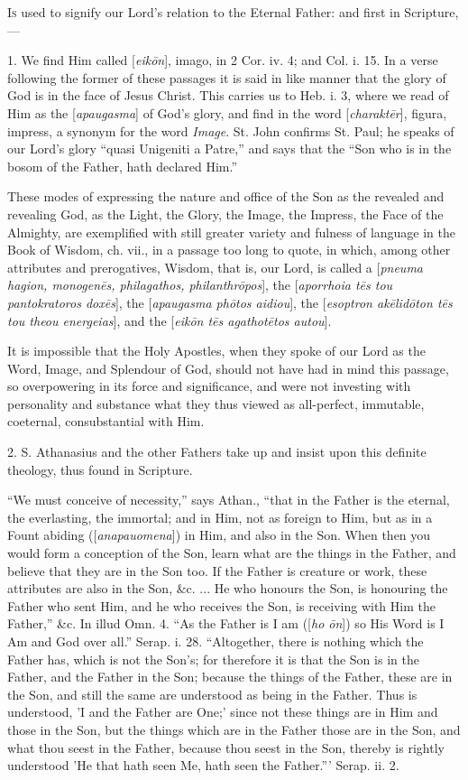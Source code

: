 
I\textsc{s} used to signify our Lord's relation to the
Eternal Father: and first in Scripture,—

1. We find Him called [\emph{eik\={o}n}],
imago, in 2 Cor. iv. 4; and Col. i. 15. In a verse following the
former of these passages it is said in like manner that the glory of
God is in the face of Jesus Christ. This carries us to Heb. i. 3,
where we read of Him as the [\emph{apaugasma}] of God's glory, and
find in the word [\emph{charakt\={e}r}], figura, impress, a synonym
for the word \emph{Image}. St. John confirms St. Paul; he speaks of
our Lord's glory ``quasi Unigeniti a Patre,'' and says that the ``Son who is in the bosom of the Father, hath declared Him.''

These modes of expressing the nature and office
of the Son as the revealed and revealing God, as the Light, the Glory,
the Image, the Impress, the Face of the Almighty, are exemplified with
still greater variety and fulness of language in the Book of Wisdom,
ch. vii., in a passage too long to quote, in which, among other
attributes and prerogatives, Wisdom, that is, our Lord, is called a [\emph{pneuma
hagion, monogen\={e}s, philagathos, philanthr\={o}pos}], the
[\emph{aporrhoia t\={e}s tou pantokratoros dox\={e}s}], the [\emph{apaugasma
ph\={o}tos aidiou}], the [\emph{esoptron ak\={e}lid\={o}ton t\={e}s
tou theou energeias}], and the [\emph{eik\={o}n t\={e}s agathot\={e}tos
autou}].

It is impossible that the Holy Apostles, when
they spoke of our Lord as the Word, Image, and Splendour of God,
should not have had in mind this passage, so overpowering in its force
and significance, and were not investing with personality and
substance what they thus viewed as all-perfect, immutable, coeternal,
consubstantial with Him.

2. S. Athanasius and the other Fathers take up
and insist upon this definite theology, thus found in Scripture.

``We must conceive of necessity,'' says Athan., ``that in the Father is the eternal, the everlasting, the immortal;
and in Him, not as foreign to Him, but as in a Fount abiding ([\emph{anapauomena}])
in Him, and also in the Son. When then you would form a conception of
the Son, learn what are the things in the Father, and believe that
they are in the Son too. If the Father is creature or work, these
attributes are also in the Son, \&c. ... He who honours the Son, is
honouring the Father who sent Him, and he who receives the Son, is
receiving with Him the Father,'' \&c. In illud Omn. 4. ``As the
Father is I am ([\emph{ho \={o}n}]) so His Word is I Am and God
over all.'' Serap. i. 28. ``Altogether, there is nothing which the
Father has, which is not the Son's; for therefore it is that the Son
is in the Father, and the Father in the Son; because the things of the
Father, these are in the Son, and still the same are understood as
being in the Father. Thus is understood, 'I and the Father are One;'
since not these things are in Him and those in the Son, but the things
which are in the Father those are in the Son, and what thou seest in
the Father, because thou seest in the Son, thereby is rightly
understood 'He that hath seen Me, hath seen the Father.''' Serap. ii.
2.

